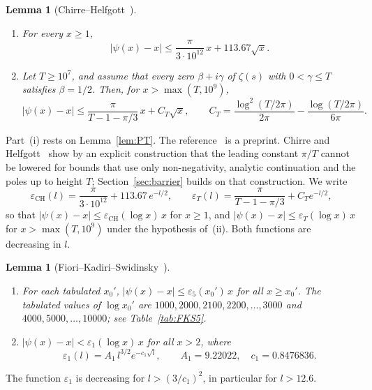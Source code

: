 \documentclass{amsart}
\newtheorem{lemma}[theorem]{Lemma}
\theoremstyle{definition}
\theoremstyle{remark}
\theoremstyle{plain}
\numberwithin{equation}{section}
\newcommand{\eps}{\varepsilon}
\newcommand{\epsCH}{\eps_{\mathrm{CH}}}
\begin{document}
\begin{lemma}[Chirre--Helfgott~\cite{CH25}]\label{lem:CH}
\begin{enumerate}
\item[(i)] \cite[Cor.~1.3]{CH25} For every $x\ge1$,
\[
|\psi(x)-x|\le\frac{\pi}{3\cdot10^{12}}\,x+113.67\sqrt x.
\]
\item[(ii)] \cite[Prop.~9.1 with $\sigma=0$, and~(9.2)]{CH25} Let $T\ge10^7$, and assume that every zero $\beta+i\gamma$ of $\zeta(s)$ with $0<\gamma\le T$ satisfies $\beta=1/2$. Then, for $x>\max(T,10^9)$,
\[
|\psi(x)-x|\le\frac{\pi}{T-1-\pi/3}\,x+C_T\sqrt x,\qquad C_T=\frac{\log^2(T/2\pi)}{2\pi}-\frac{\log(T/2\pi)}{6\pi}.
\]
\end{enumerate}
\end{lemma}

Part~(i) rests on Lemma~\ref{lem:PT}. The reference~\cite{CH25} is a preprint. Chirre and Helfgott~\cite[Prop.~3.1]{CH25} show by an explicit construction that the leading constant $\pi/T$ cannot be lowered for bounds that use only non-negativity, analytic continuation and the poles up to height $T$; Section~\ref{sec:barrier} builds on that construction. We write
\[
\epsCH(l)=\frac{\pi}{3\cdot10^{12}}+113.67\,e^{-l/2},\qquad
\eps_T(l)=\frac{\pi}{T-1-\pi/3}+C_Te^{-l/2},
\]
so that $|\psi(x)-x|\le\epsCH(\log x)\,x$ for $x\ge1$, and $|\psi(x)-x|\le\eps_T(\log x)\,x$ for $x>\max(T,10^9)$ under the hypothesis of~(ii). Both functions are decreasing in $l$.

\begin{lemma}[Fiori--Kadiri--Swidinsky~\cite{FKS23}]\label{lem:FKS}
\begin{enumerate}
\item[(i)] \cite[Thm.~1.1, Table~5]{FKS23} For each tabulated $x_0'$, $|\psi(x)-x|\le\eps_5(x_0')\,x$ for all $x\ge x_0'$. The tabulated values of $\log x_0'$ are $1000,2000,2100,2200,\dots,3000$ and $4000,5000,\dots,10000$; see Table~\ref{tab:FKS5}.
\item[(ii)] \cite[Cor.~1.4]{FKS23} $|\psi(x)-x|<\eps_1(\log x)\,x$ for all $x>2$, where
\[
\eps_1(l)=A_1\,l^{3/2}e^{-c_1\sqrt l},\qquad A_1=9.22022,\quad c_1=0.8476836.
\]
\end{enumerate}
\end{lemma}

The function $\eps_1$ is decreasing for $l>(3/c_1)^2$, in particular for $l>12.6$.
\end{document}
